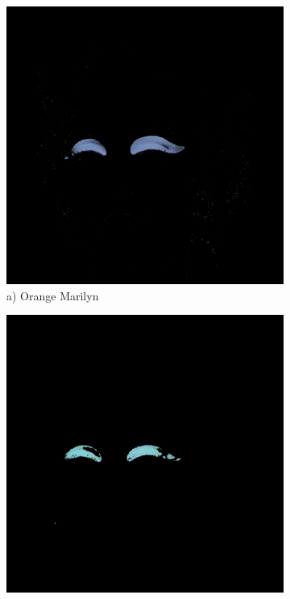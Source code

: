 \documentclass{article}
\begin{document}
\begin{figure}[htbp]
    \centering
    \begin{subfigure}[b]{0.19\textwidth}
        \includegraphics[width=\textwidth]{main_files/figure-latex/8_3_orange_marilyn_eyeshadow_extraction.jpg}
        \caption*{a) Orange Marilyn}
    \end{subfigure}
    \hfill
    \begin{subfigure}[b]{0.19\textwidth}
        \includegraphics[width=\textwidth]{main_files/figure-latex/9_3_red_marilyn_eyeshadow_extraction.jpg}

\end{subfigure}
\end{figure}
\end{document}
